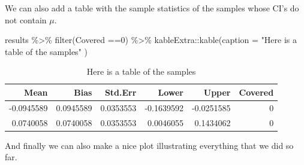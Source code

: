 \documentclass[
]{book}
\newenvironment{Shaded}{\begin{snugshade}}{\end{snugshade}}
\newcommand{\AttributeTok}[1]{\textcolor[rgb]{0.77,0.63,0.00}{#1}}
\newcommand{\DecValTok}[1]{\textcolor[rgb]{0.00,0.00,0.81}{#1}}
\newcommand{\FunctionTok}[1]{\textcolor[rgb]{0.00,0.00,0.00}{#1}}
\newcommand{\NormalTok}[1]{#1}
\newcommand{\OtherTok}[1]{\textcolor[rgb]{0.56,0.35,0.01}{#1}}
\newcommand{\SpecialCharTok}[1]{\textcolor[rgb]{0.00,0.00,0.00}{#1}}
\newcommand{\StringTok}[1]{\textcolor[rgb]{0.31,0.60,0.02}{#1}}
\begin{document}
We can also add a table with the sample statistics of the samples whose CI's do not contain \(\mu\).

\begin{Shaded}
\begin{Highlighting}[]
\NormalTok{results }\SpecialCharTok{\%\textgreater{}\%}
  \FunctionTok{filter}\NormalTok{(Covered }\SpecialCharTok{==}\DecValTok{0}\NormalTok{) }\SpecialCharTok{\%\textgreater{}\%}
\NormalTok{  kableExtra}\SpecialCharTok{::}\FunctionTok{kable}\NormalTok{(}\AttributeTok{caption =} \StringTok{"Here is a table of the samples"}\NormalTok{ )}
\end{Highlighting}
\end{Shaded}

\begin{table}

\caption{\label{tab:unnamed-chunk-6}Here is a table of the samples}
\centering
\begin{tabular}[t]{r|r|r|r|r|r}
\hline
Mean & Bias & Std.Err & Lower & Upper & Covered\\
\hline
-0.0945589 & 0.0945589 & 0.0353553 & -0.1639592 & -0.0251585 & 0\\
\hline
0.0740058 & 0.0740058 & 0.0353553 & 0.0046055 & 0.1434062 & 0\\
\hline
\end{tabular}
\end{table}

And finally we can also make a nice plot illustrating everything that we did so far.

\begin{Shaded}
\end{Shaded}
\end{document}
